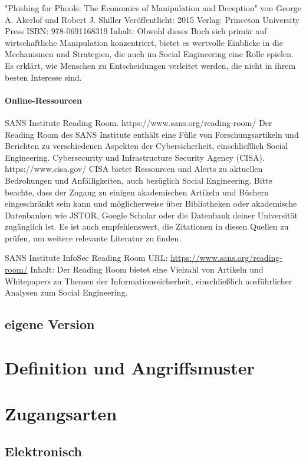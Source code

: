 "Phishing for Phools: The Economics of Manipulation and Deception" von George A. Akerlof und Robert J. Shiller
Veröffentlicht: 2015
Verlag: Princeton University Press
ISBN: 978-0691168319
Inhalt: Obwohl dieses Buch sich primär auf wirtschaftliche Manipulation konzentriert, bietet es wertvolle Einblicke in die Mechanismen und Strategien, die auch im Social Engineering eine Rolle spielen. Es erklärt, wie Menschen zu Entscheidungen verleitet werden, die nicht in ihrem besten Interesse sind.

\paragraph*{Online-Ressourcen}
SANS Institute Reading Room. https://www.sans.org/reading-room/ Der Reading Room des SANS Institute enthält eine Fülle von Forschungsartikeln und Berichten zu verschiedenen Aspekten der Cybersicherheit, einschließlich Social Engineering.
Cybersecurity und Infrastructure Security Agency (CISA). https://www.cisa.gov/ CISA bietet Ressourcen und Alerts zu aktuellen Bedrohungen und Anfälligkeiten, auch bezüglich Social Engineering.
Bitte beachte, dass der Zugang zu einigen akademischen Artikeln und Büchern eingeschränkt sein kann und möglicherweise über Bibliotheken oder akademische Datenbanken wie JSTOR, Google Scholar oder die Datenbank deiner Universität zugänglich ist. Es ist auch empfehlenswert, die Zitationen in diesen Quellen zu prüfen, um weitere relevante Literatur zu finden.

SANS Institute InfoSec Reading Room
URL: \url{https://www.sans.org/reading-room/}
Inhalt: Der Reading Room bietet eine Vielzahl von Artikeln und Whitepapers zu Themen der Informationssicherheit, einschließlich ausführlicher Analysen zum Social Engineering.

\subsection*{eigene Version}

\section{Definition und Angriffsmuster}

\section{Zugangsarten}

\subsection{Elektronisch}
